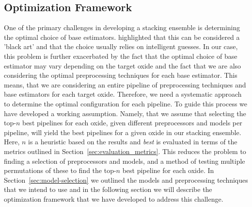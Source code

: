 \subsection{Optimization Framework}\label{sec:optimization-framework}
One of the primary challenges in developing a stacking ensemble is determining the optimal choice of base estimators.
\citet{wolpert1992stacked} highlighted that this can be considered a 'black art' and that the choice usually relies on intelligent guesses.
In our case, this problem is further exacerbated by the fact that the optimal choice of base estimator may vary depending on the target oxide and the fact that we are also considering the optimal preprocessing techniques for each base estimator.
This means, that we are considering an entire pipeline of preprocessing techniques and base estimators for each target oxide.
Therefore, we need a systematic approach to determine the optimal configuration for each pipeline.
To guide this process we have developed a working assumption.
Namely, that we assume that selecting the top-$n$ best pipelines for each oxide, given different preprocessors and models per pipeline, will yield the best pipelines for a given oxide in our stacking ensemble.
Here, $n$ is a heuristic based on the results and \textit{best} is evaluated in terms of the metrics outlined in Section~\ref{sec:evaluation_metrics}.
This reduces the problem to finding a selection of preprocessors and models, and a method of testing multiple permutations of these to find the top-$n$ best pipeline for each oxide.
In Section~\ref{sec:model-selection} we outlined the models and preprocessing techniques that we intend to use and in the following section we will describe the optimization framework that we have developed to address this challenge.


















